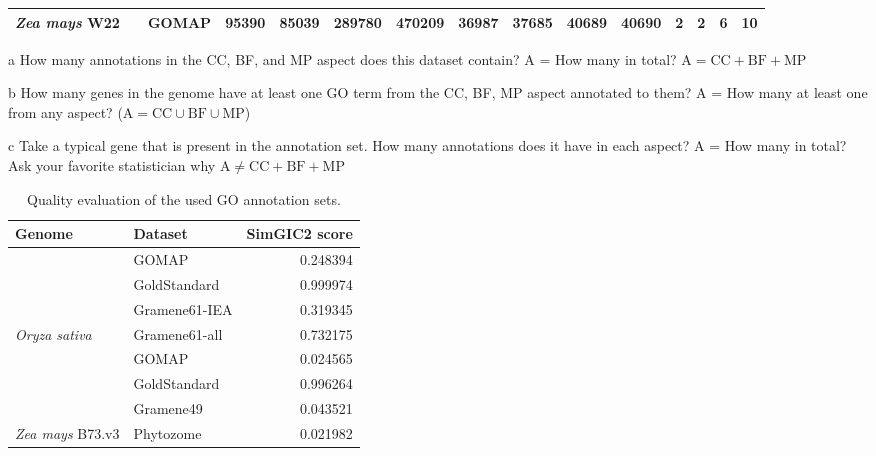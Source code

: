 \documentclass[utf8]{frontiersSCNS}
\begin{document}
\begin{table}[t]
{\begin{threeparttable}
\begin{tabular}{lrlrrr>{\bfseries}r|rrr>{\bfseries}r|rrr>{\bfseries}r}
\textit{Zea mays} W22 & \multirow{-20}{*}{\raggedleft\arraybackslash 100} & GOMAP & 95390 & 85039 & 289780 & 470209 & 36987 & 37685 & 40689 & 40690 & 2 & 2 & 6 & 10\\
\bottomrule
\end{tabular}
\begin{tablenotes}
\item[a] How many annotations in the CC, BF, and MP aspect does this dataset contain? A = How many in total? $\textrm{A} = \textrm{CC} + \textrm{BF} + \textrm{MP}$
\item[b] How many genes in the genome have at least one GO term from the CC, BF, MP aspect annotated to them? A = How many at least one from any aspect? ($\textrm{A} = \textrm{CC} \cup \textrm{BF} \cup \textrm{MP}$)
\item[c] Take a typical gene that is present in the annotation set. How many annotations does it have in each aspect? A = How many in total? Ask your favorite statistician why $\textrm{A} \neq \textrm{CC} + \textrm{BF} +\textrm{MP}$
\end{tablenotes}
\end{threeparttable}}
\end{table}

\begin{table}[t]

\caption{\label{tab:quality-table}Quality evaluation of the used GO annotation sets.}
\centering
\begin{tabular}{llr}
\toprule
Genome & Dataset & SimGIC2 score\\
\midrule
\rowcolor{gray!6}   & GOMAP & 0.248394\\

 & GoldStandard & 0.999974\\

\rowcolor{gray!6}   & Gramene61-IEA & 0.319345\\

\multirow{-4}{*}{\raggedright\arraybackslash \textit{Oryza sativa}} & Gramene61-all & 0.732175\\
\cmidrule{1-3}
\rowcolor{gray!6}   & GOMAP & 0.024565\\

 & GoldStandard & 0.996264\\

\rowcolor{gray!6}   & Gramene49 & 0.043521\\

\multirow{-4}{*}{\raggedright\arraybackslash \textit{Zea mays} B73.v3} & Phytozome & 0.021982\\
\bottomrule
\end{tabular}
\end{table}
\end{document}
